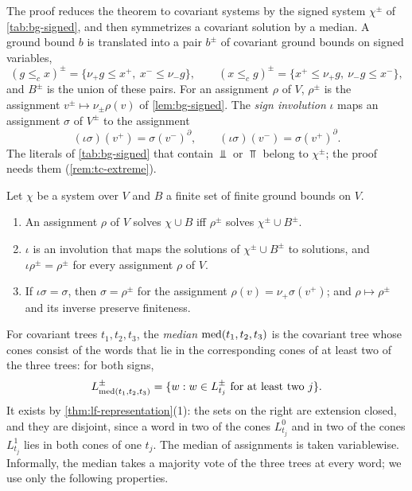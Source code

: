The proof reduces the theorem to covariant systems by the signed system
$\chi^\pm$ of \cref{tab:bg-signed}, and then symmetrizes a covariant solution
by a median. A ground bound $b$ is translated into a pair $b^\pm$ of
covariant ground bounds on signed variables,
\begin{equation}\label{eq:tc-signed-bounds}
 (g\le_cx)^\pm=\{\nu_+g\le x^+,\ x^-\le\nu_-g\},\qquad
 (x\le_cg)^\pm=\{x^+\le\nu_+g,\ \nu_-g\le x^-\},
\end{equation}
and $B^\pm$ is the union of these pairs. For an assignment $\rho$ of $V$,
$\rho^\pm$ is the assignment $v^\pm\mapsto\nu_\pm\rho(v)$ of
\cref{lem:bg-signed}. The \emph{sign involution} $\iota$ maps an assignment
$\sigma$ of $V^\pm$ to the assignment
\[
 (\iota\sigma)(v^+)=\sigma(v^-)^\partial,\qquad
 (\iota\sigma)(v^-)=\sigma(v^+)^\partial .
\]
The literals of \cref{tab:bg-signed} that contain $\Bot$ or $\Top$ belong to
$\chi^\pm$; the proof needs them (\cref{rem:tc-extreme}).

\begin{lemma}\label{lem:tc-signed}
Let $\chi$ be a system over $V$ and $B$ a finite set of finite ground bounds on
$V$.
\begin{enumerate}[leftmargin=*]
\item An assignment $\rho$ of $V$ solves $\chi\cup B$ iff $\rho^\pm$ solves
  $\chi^\pm\cup B^\pm$.
\item $\iota$ is an involution that maps the solutions of $\chi^\pm\cup B^\pm$
  to solutions, and $\iota\rho^\pm=\rho^\pm$ for every assignment $\rho$ of
  $V$.
\item If $\iota\sigma=\sigma$, then $\sigma=\rho^\pm$ for the assignment
  $\rho(v)=\nu_+\sigma(v^+)$; and $\rho\mapsto\rho^\pm$ and its inverse
  preserve finiteness.
\end{enumerate}
\end{lemma}

For covariant trees $t_1,t_2,t_3$, the \emph{median} $\operatorname{med}(t_1,t_2,t_3)$ is
the covariant tree whose cones consist of the words that lie in the
corresponding cones of at least two of the three trees: for both signs,
\[
 L^\pm_{\operatorname{med}(t_1,t_2,t_3)}=\{w:w\in L^\pm_{t_j}\text{ for at least two }j\}.
\]
It exists by \cref{thm:lf-representation}(1): the sets on the right are
extension closed, and they are disjoint, since a word in two of the cones
$L^0_{t_j}$ and in two of the cones $L^1_{t_j}$ lies in both cones of one
$t_j$. The median of assignments is taken variablewise. Informally, the median
takes a majority vote of the three trees at every word; we use only the
following properties.

